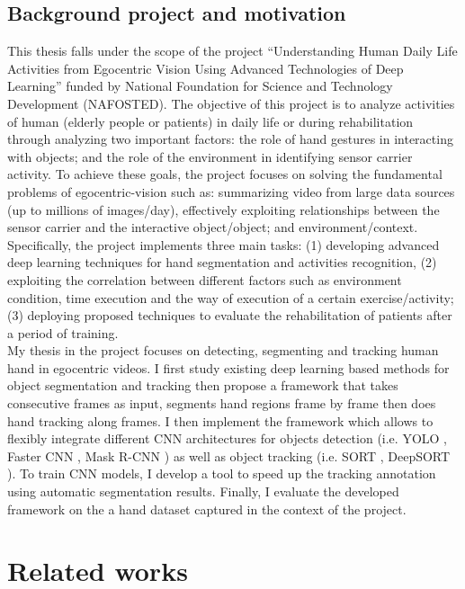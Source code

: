 \subsection{Background project and motivation}
This thesis falls under the scope of the project “Understanding Human Daily Life Activities from Egocentric Vision Using Advanced Technologies of Deep Learning” funded by National Foundation for Science and Technology Development (NAFOSTED). The objective of this project is to analyze activities of human (elderly people or patients) in daily life or during rehabilitation through analyzing two important factors: the role of hand gestures in interacting with objects; and the role of the environment in identifying sensor carrier activity.
To achieve these goals, the project focuses on solving the fundamental problems of egocentric-vision such as: summarizing video from large data sources (up to millions of images/day), effectively exploiting relationships between the sensor carrier and the interactive object/object; and environment/context. Specifically, the project implements three main tasks: (1) developing advanced deep learning techniques for hand segmentation and activities recognition, (2) exploiting the correlation between different factors such as  environment condition, time execution and the way of execution of a certain exercise/activity; (3) deploying proposed techniques to evaluate the rehabilitation of patients after a period of training.
\\My thesis in the project focuses on detecting, segmenting and tracking human hand in egocentric videos. I first study existing deep learning based methods for object segmentation and tracking then propose a framework that takes consecutive frames as input, segments hand regions frame by frame then does hand tracking along frames. I then implement the framework which allows to flexibly integrate different CNN architectures for objects detection (i.e. YOLO \cite{DBLP:journals/corr/RedmonDGF15}, Faster CNN \cite{DBLP:journals/corr/RenHG015}, Mask R-CNN \cite{DBLP:journals/corr/HeGDG17}) as well as object tracking (i.e. SORT \cite{DBLP:journals/corr/BewleyGORU16}, DeepSORT \cite{DBLP:journals/corr/WojkeBP17}). To train CNN models, I develop a tool to speed up the tracking annotation using automatic segmentation results. Finally, I evaluate the developed framework on the a hand dataset captured in the context of the project.
\section{Related works}
